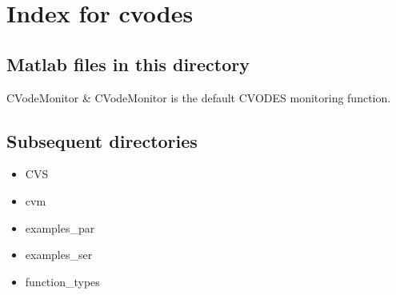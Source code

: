 \section{Index for {\sc cvodes}}

\subsection{Matlab files in this directory}

\begin{tabular}

CVodeMonitor & CVodeMonitor is the default CVODES monitoring function.  \\
\end{tabular}


\subsection{Subsequent directories}

\begin{itemize}


\item CVS
\item cvm
\item examples_par
\item examples_ser
\item function_types
\end{itemize}